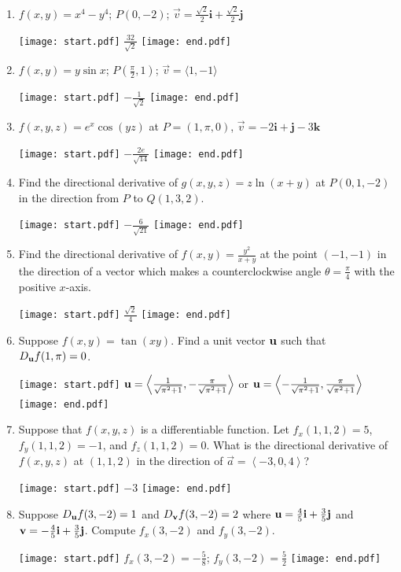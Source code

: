 \documentclass[12pt]{article}
\begin{document}
\begin{enumerate}

\item $f(x,y)=x^4-y^4$; $P(0,-2)$; $\overrightarrow{v}=\frac{\sqrt{2}}{2}\mathbf{i}+\frac{\sqrt{2}}{2}\mathbf{j}$ 

\texttt{[image: start.pdf]}
{{$\frac{32}{\sqrt{2}}$}}
\texttt{[image: end.pdf]}


\item $f(x,y)=y\sin{x}$; $P\left(\frac{\pi}{2},1\right)$; $\overrightarrow{v}=\langle 1,-1 \rangle$ 

\texttt{[image: start.pdf]}
{{$-\frac{1}{\sqrt{2}}$}}
\texttt{[image: end.pdf]}


\item $f(x,y,z)=e^{x}\cos{(yz)}$ at $P=(1, \pi, 0)$, $\overrightarrow{v}=-2\mathbf{i}+\mathbf{j}-3\mathbf{k}$ 

\texttt{[image: start.pdf]}
{{$-\frac{2e}{\sqrt{14}}$}}
\texttt{[image: end.pdf]}


\item Find the directional derivative of $g(x,y,z)=z\ln{(x+y)}$ at $P(0,1,-2)$ in the direction from $P$ to $Q(1,3, 2)$.

\texttt{[image: start.pdf]}
{{$-\frac{6}{\sqrt{21}}$}}
\texttt{[image: end.pdf]}


\item Find the directional derivative of $f(x,y)=\frac{y^2}{x+y}$ at the point $(-1,-1)$ in the direction of a vector which makes a counterclockwise angle $\theta=\frac{\pi}{4}$ with the positive $x$-axis.

\texttt{[image: start.pdf]}
{{$\frac{\sqrt{2}}{4}$}}
\texttt{[image: end.pdf]}


\item Suppose $f(x,y)=\tan{(xy)}$.  Find a unit vector ${\bf u}$ such that $D_{\bf u}f(1,\pi)=0$.

\texttt{[image: start.pdf]}
{{${\bf u}=\left\langle\frac{1}{\sqrt{\pi^2+1}},-\frac{\pi}{\sqrt{\pi^2+1}}\right\rangle$ or ${\bf u}=\left\langle-\frac{1}{\sqrt{\pi^2+1}},\frac{\pi}{\sqrt{\pi^2+1}}\right\rangle$}}
\texttt{[image: end.pdf]}


\item Suppose that $\displaystyle f(x,y,z)$ is a differentiable function.  Let $\displaystyle f_{x}(1,1,2)=5$, $\displaystyle f_{y}(1,1,2)=-1$, and $\displaystyle f_{z}(1,1,2)=0$.  What is the directional derivative of $\displaystyle f(x,y,z)$ at $(1,1,2)$ in the direction of $\displaystyle \overrightarrow{a}=\left \langle -3, 0, 4 \right \rangle$?

\texttt{[image: start.pdf]}
{{$-3$}}
\texttt{[image: end.pdf]}


\item Suppose $D_{\bf u}f(3,-2)=1$ and $D_{\bf v}f(3,-2)=2$ where ${\bf u}=\frac{4}{5}{\bf i}+\frac{3}{5}{\bf j}$ and ${\bf v}=-\frac{4}{5}{\bf i}+\frac{3}{5}{\bf j}$. Compute $f_x(3,-2)$ and $f_y(3,-2)$.

\texttt{[image: start.pdf]}
{{$f_x(3,-2)=-\frac{5}{8}$; $f_y(3,-2)=\frac{5}{2}$ }}
\texttt{[image: end.pdf]}


\end{enumerate}
\end{document}
